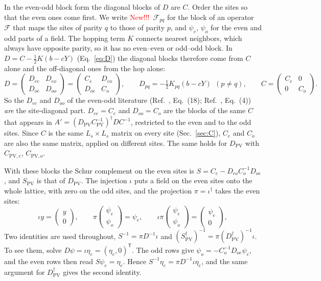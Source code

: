 \documentclass[11pt,a4paper]{article}
\newif\ifshownew \shownewtrue
\DeclareRobustCommand\New{\ifshownew\textcolor{red}{New!!!}\ \else\ignorespaces\fi}
\numberwithin{equation}{section}
\newcommand{\dg}{^{\dagger}}
\newcommand{\Dpv}{D_{\mathrm{PV}}}
\newcommand{\Cpv}{C_{\mathrm{PV}}}
\newcommand{\Spv}{S_{\mathrm{PV}}}
\newcommand{\Ce}{C_{e}}
\newcommand{\Co}{C_{o}}
\newcommand{\Cpve}{C_{\mathrm{PV},e}}
\newcommand{\Cpvo}{C_{\mathrm{PV},o}}
\begin{document}
In the even-odd block form the diagonal blocks of $D$ are $C$. Order the sites so that the even ones come first.
We write \New $\mathcal F_{pq}$ for the block of an operator $\mathcal F$ that maps the sites of parity $q$ to those of
parity $p$, and $\psi_e$, $\psi_o$ for the even and odd parts of a field.
The hopping term $K$ connects nearest neighbors, which always have opposite parity, so it has
no even--even or odd--odd block. In $D=C-\tfrac12K(b-cY)$ (Eq.~\eqref{eq:D}) the diagonal
blocks therefore come from $C$ alone and the off-diagonal ones from the hop alone:
\begin{equation}
D=\begin{pmatrix}D_{ee}&D_{eo}\\D_{oe}&D_{oo}\end{pmatrix}
=\begin{pmatrix}\Ce & D_{eo}\\ D_{oe} & \Co\end{pmatrix},\qquad
D_{pq}=-\tfrac12K_{pq}(b-cY)\ \ (p\neq q),\qquad
C=\begin{pmatrix}\Ce&0\\0&\Co\end{pmatrix}.
\label{eq:Dblocks}
\end{equation}
So the $D_{ee}$ and $D_{oo}$ of the even-odd literature (Ref.~\cite{CKMN}, Eq.~(18);
Ref.~\cite{KCM2024}, Eq.~(4)) \emph{are} the site-diagonal part. $D_{ee}=\Ce$ and
$D_{oo}=\Co$ are the blocks of the same $C$ that appears in $A'=(\Dpv\Cpv^{-1})\dg DC^{-1}$,
restricted to the even and to the odd sites. Since $C$ is the same $L_s\times L_s$ matrix
on every site (Sec.~\ref{sec:C}), $\Ce$ and $\Co$ are also the same matrix, applied on
different sites. The same holds for $\Dpv$ with $\Cpve$, $\Cpvo$.

With these blocks the Schur complement on the even sites is $S=\Ce-D_{eo}\Co^{-1}D_{oe}$, and
$\Spv$ is that of $\Dpv$. The injection $\iota$ puts a field on the even sites onto the whole
lattice, with zero on the odd sites, and the projection $\pi=\iota\dg$ takes the even sites:
\begin{equation}
\iota y=\begin{pmatrix}y\\0\end{pmatrix},\qquad
\pi\begin{pmatrix}\psi_e\\\psi_o\end{pmatrix}=\psi_e,\qquad
\iota\pi\begin{pmatrix}\psi_e\\\psi_o\end{pmatrix}=\begin{pmatrix}\psi_e\\0\end{pmatrix},
\label{eq:iotapi}
\end{equation}
Two identities are used throughout, $S^{-1}=\pi D^{-1}\iota$ and
$(\Spv\dg)^{-1}=\pi(\Dpv\dg)^{-1}\iota$. To see them, solve $D\psi=\iota\eta_e=(\eta_e,0)^{\mathsf T}$. The odd rows give
$\psi_o=-\Co^{-1}D_{oe}\psi_e$, and the even rows then read $S\psi_e=\eta_e$. Hence
$S^{-1}\eta_e=\pi D^{-1}\iota\eta_e$, and the same argument for $\Dpv\dg$ gives the second identity.
\end{document}
